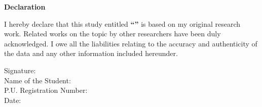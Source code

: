 \begin{titlepage}
\label{front:declaration}
    
    \vspace*{28pt} 
    \vspace{10pt} %

    \begin{center}
        {\fontsize{16}{20}\selectfont \textbf{Declaration}}
    \end{center}
    
    \vspace{14pt} 
    \vspace{10pt} %

    {\fontsize{12}{18}\selectfont
    \noindent
    I hereby declare that this study entitled \textbf{``\myThesisTitle''} is based on my original research work. Related works on the topic by other researchers have been duly acknowledged. I owe all the liabilities relating to the accuracy and authenticity of the data and any other information included hereunder.
    }

    \vspace*{42pt}
    \vspace{10pt} %

    \begin{flushleft}
        {\fontsize{12}{18}\selectfont
        Signature: \underline{\hspace{5cm}} \\[12pt]
        Name of the Student: \myStudentName \\[12pt]
        P.U. Registration Number: \myRegistrationNumber \\[12pt]
        Date: \underline{\hspace{5cm}}
        }
    \end{flushleft}

\end{titlepage}